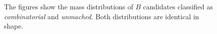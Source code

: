 \begin{figure}[ht]
    \centering
    \caption{\scriptsize The figures show the mass distributions of $B$ candidates classified as
    \textit{combinatorial} and \textit{unmached}. Both distributions are identical in shape.}
    \label{fig:unmatched_combinatorial}
\end{figure}

\clearpage

